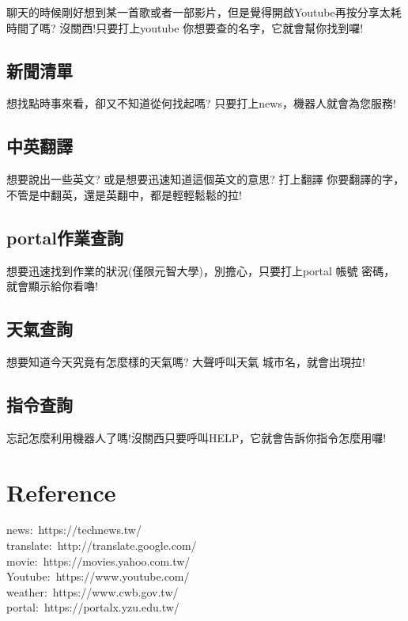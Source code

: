 \documentclass{scrreprt}
\begin{document}
\begin{CJK}{UTF8}{bkai}
聊天的時候剛好想到某一首歌或者一部影片，但是覺得開啟Youtube再按分享太耗時間了嗎? 沒關西!只要打上{\color{red}youtube 你想要查的名字}，它就會幫你找到囉!

\section{新聞清單}

想找點時事來看，卻又不知道從何找起嗎? 只要打上{\color{red}news}，機器人就會為您服務!

\section{中英翻譯}

想要說出一些英文? 或是想要迅速知道這個英文的意思? 打上{\color{red}翻譯 你要翻譯的字}，不管是中翻英，還是英翻中，都是輕輕鬆鬆的拉!

\section{portal作業查詢}

想要迅速找到作業的狀況(僅限元智大學)，別擔心，只要打上{\color{red}portal 帳號 密碼}，就會顯示給你看嚕!

\section{天氣查詢}

想要知道今天究竟有怎麼樣的天氣嗎? 大聲呼叫{\color{red}天氣 城市名}，就會出現拉!

\section{指令查詢}

忘記怎麼利用機器人了嗎!沒關西只要呼叫{\color{red}HELP}，它就會告訴你指令怎麼用囉!

\chapter{Reference}

news$:$ {\color{blue}https://technews.tw/}\\
translate$:$ {\color{blue}http://translate.google.com/}\\
movie$:$ {\color{blue}https://movies.yahoo.com.tw/}\\
Youtube$:$ {\color{blue}https://www.youtube.com/}\\
weather$:$ {\color{blue}https://www.cwb.gov.tw/}\\
portal$:$ {\color{blue}https://portalx.yzu.edu.tw/}

\end{CJK}
\end{document}
